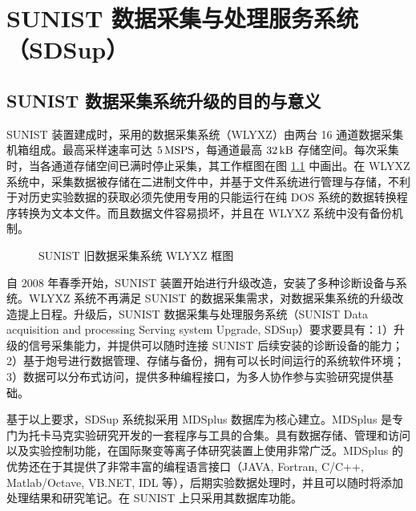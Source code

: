 \graphicspath{{figures/appendix-SDSup/}}

\chapter{SUNIST 数据采集与处理服务系统（SDSup）}

\section{SUNIST 数据采集系统升级的目的与意义}

SUNIST 装置建成时，采用的数据采集系统（WLYXZ）\cite{}由两台 16 通道数据采集机箱组成。最高采样速率可达 $5\,{\rm MSPS}$，每通道最高 $32\,{\rm kB}$ 存储空间。每次采集时，当各通道存储空间已满时停止采集，其工作框图在图 \ref{fig:chap04:wlyxz} 中画出。在 WLYXZ 系统中，采集数据被存储在二进制文件中，并基于文件系统进行管理与存储，不利于对历史实验数据的获取\pozhehao 必须先使用专用的只能运行在纯 DOS 系统的数据转换程序转换为文本文件。而且数据文件容易损坏，并且在 WLYXZ 系统中没有备份机制。

\begin{figure}%
  \centering
  \caption{SUNIST 旧数据采集系统 WLYXZ 框图}
  \label{fig:chap04:wlyxz}
\end{figure}

自 2008 年春季开始，SUNIST 装置开始进行升级改造，安装了多种诊断设备与系统。WLYXZ 系统不再满足 SUNIST 的数据采集需求，对数据采集系统的升级改造提上日程。升级后，SUNIST 数据采集与处理服务系统（SUNIST Data acquisition and processing Serving system Upgrade, SDSup）要求要具有：1）升级的信号采集能力，并提供可以随时连接 SUNIST 后续安装的诊断设备的能力；2）基于炮号进行数据管理、存储与备份，拥有可以长时间运行的系统软件环境；3）数据可以分布式访问，提供多种编程接口，为多人协作参与实验研究提供基础。

基于以上要求，SDSup 系统拟采用 MDSplus\cite{MDSplus:url,MDSplus:paper:1,MDSplus:paper:2} 数据库为核心建立。MDSplus 是专门为托卡马克实验研究开发的一套程序与工具的合集。具有数据存储、管理和访问以及实验控制功能，在国际聚变等离子体研究装置上使用非常广泛\cite{MDSplus:use:NSTX,MDSplus:use:EAST,MDSplus:use:TCABR}。MDSplus 的优势还在于其提供了非常丰富的编程语言接口（JAVA, Fortran, C/C++, Matlab/Octave, VB.NET, IDL 等），后期实验数据处理时，并且可以随时将添加处理结果和研究笔记。在 SUNIST 上只采用其数据库功能。

